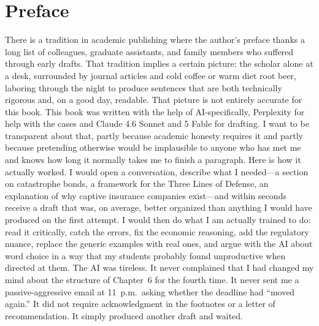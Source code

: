 \documentclass[11pt,openany]{book}
\begin{document}
\hypersetup{pageanchor=true}
\chapter*{Preface}
{}

\begin{center}
\end{center}
\doublespacing
There is a tradition in academic publishing where the author's preface thanks a long list of colleagues, graduate assistants, and family members who suffered through early drafts. That tradition implies a certain picture: the scholar alone at a desk, surrounded by journal articles and cold coffee or warm diet root beer, laboring through the night to produce sentences that are both technically rigorous and, on a good day, readable.
That picture is not entirely accurate for this book.
This book was written with the help of AI-specifically, Perplexity for help with the cases and Claude 4.6 Sonnet and 5 Fable for drafting. I want to be transparent about that, partly because academic honesty requires it and partly because pretending otherwise would be implausible to anyone who has met me and knows how long it normally takes me to finish a paragraph.
Here is how it actually worked. I would open a conversation, describe what I needed---a section on catastrophe bonds, a framework for the Three Lines of Defense, an explanation of why captive insurance companies exist---and within seconds receive a draft that was, on average, better organized than anything I would have produced on the first attempt. I would then do what I am actually trained to do: read it critically, catch the errors, fix the economic reasoning, add the regulatory nuance, replace the generic examples with real ones, and argue with the AI about word choice in a way that my students probably found unproductive when directed at them.
The AI was tireless. It never complained that I had changed my mind about the structure of Chapter~6 for the fourth time. It never sent me a passive-aggressive email at 11~p.m.\ asking whether the deadline had ``moved again.'' It did not require acknowledgment in the footnotes or a letter of recommendation. It simply produced another draft and waited.
\end{document}
